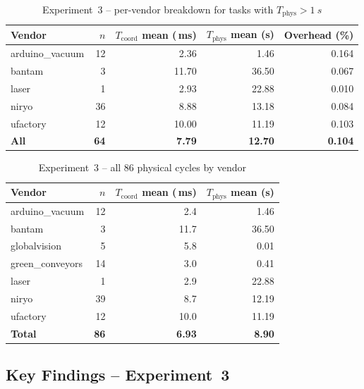 \documentclass[11pt,a4paper]{article}
\newcommand{\ms}{\,\si{ms}}
\begin{document}
\begin{table}[h]
\centering
\caption{Experiment~3 -- per-vendor breakdown for tasks with
  $T_{\text{phys}} > \SI{1}{s}$}
\label{tab:exp3-per-vendor}
\begin{tabular}{@{}lrrrr@{}}
\toprule
\textbf{Vendor} & \textbf{$n$} &
\textbf{$T_{\text{coord}}$ mean (\ms)} &
\textbf{$T_{\text{phys}}$ mean (s)} &
\textbf{Overhead (\%)} \\
\midrule
arduino\_vacuum & 12 &  2.36 &  1.46 & 0.164 \\
bantam          &  3 & 11.70 & 36.50 & 0.067 \\
laser           &  1 &  2.93 & 22.88 & 0.010 \\
niryo           & 36 &  8.88 & 13.18 & 0.084 \\
ufactory        & 12 & 10.00 & 11.19 & 0.103 \\
\midrule
\textbf{All}    & \textbf{64} & \textbf{7.79} & \textbf{12.70} & \textbf{0.104} \\
\bottomrule
\end{tabular}
\end{table}

\begin{table}[h]
\centering
\caption{Experiment~3 -- all 86 physical cycles by vendor}
\label{tab:exp3-all-vendors}
\begin{tabular}{@{}lrrr@{}}
\toprule
\textbf{Vendor} & \textbf{$n$} &
\textbf{$T_{\text{coord}}$ mean (\ms)} &
\textbf{$T_{\text{phys}}$ mean (s)} \\
\midrule
arduino\_vacuum  & 12 &  2.4 &  1.46 \\
bantam           &  3 & 11.7 & 36.50 \\
globalvision     &  5 &  5.8 &  0.01 \\
green\_conveyors & 14 &  3.0 &  0.41 \\
laser            &  1 &  2.9 & 22.88 \\
niryo            & 39 &  8.7 & 12.19 \\
ufactory         & 12 & 10.0 & 11.19 \\
\midrule
\textbf{Total}   & \textbf{86} & \textbf{6.93} & \textbf{8.90} \\
\bottomrule
\end{tabular}
\end{table}

\subsection{Key Findings -- Experiment~3}
\end{document}
